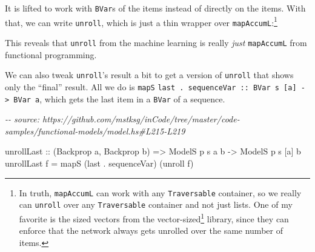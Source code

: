 \documentclass[]{article}
\newenvironment{Shaded}{}{}
\newcommand{\CommentTok}[1]{\textcolor[rgb]{0.38,0.63,0.69}{\textit{#1}}}
\newcommand{\DataTypeTok}[1]{\textcolor[rgb]{0.56,0.13,0.00}{#1}}
\newcommand{\FunctionTok}[1]{\textcolor[rgb]{0.02,0.16,0.49}{#1}}
\newcommand{\KeywordTok}[1]{\textcolor[rgb]{0.00,0.44,0.13}{\textbf{#1}}}
\newcommand{\NormalTok}[1]{#1}
\newcommand{\OperatorTok}[1]{\textcolor[rgb]{0.40,0.40,0.40}{#1}}
\newcommand{\OtherTok}[1]{\textcolor[rgb]{0.00,0.44,0.13}{#1}}
\renewcommand{\href}[2]{#2\footnote{\url{#1}}}
\begin{document}
It is lifted to work with \texttt{BVar}s of the items instead of directly on the
items. With that, we can write \texttt{unroll}, which is just a thin wrapper
over \texttt{mapAccumL}:\footnote{In truth, \texttt{mapAccumL} can work with any
  \texttt{Traversable} container, so we really can \texttt{unroll} over any
  \texttt{Traversable} container and not just lists. One of my favorite is the
  sized vectors from the
  \href{http://hackage.haskell.org/package/vector-sized}{vector-sized} library,
  since they can enforce that the network always gets unrolled over the same
  number of items.}

\begin{Shaded}
\end{Shaded}

This reveals that \texttt{unroll} from the machine learning is really
\emph{just} \texttt{mapAccumL} from functional programming.

We can also tweak \texttt{unroll}'s result a bit to get a version of
\texttt{unroll} that shows only the ``final'' result. All we do is \texttt{mapS}
\texttt{last\ .\ sequenceVar\ ::\ BVar\ s\ {[}a{]}\ -\textgreater{}\ BVar\ a},
which gets the last item in a \texttt{BVar} of a sequence.

\begin{Shaded}
\begin{Highlighting}[]
\CommentTok{{-}{-} source: https://github.com/mstksg/inCode/tree/master/code{-}samples/functional{-}models/model.hs\#L215{-}L219}

\NormalTok{unrollLast}
\OtherTok{    ::}\NormalTok{ (}\DataTypeTok{Backprop}\NormalTok{ a, }\DataTypeTok{Backprop}\NormalTok{ b)}
    \OtherTok{=\textgreater{}} \DataTypeTok{ModelS}\NormalTok{ p s  a  b}
    \OtherTok{{-}\textgreater{}} \DataTypeTok{ModelS}\NormalTok{ p s [a] b}
\NormalTok{unrollLast f }\OtherTok{=}\NormalTok{ mapS (}\FunctionTok{last} \OperatorTok{.}\NormalTok{ sequenceVar) (unroll f)}
\end{Highlighting}
\end{Shaded}
\end{document}
